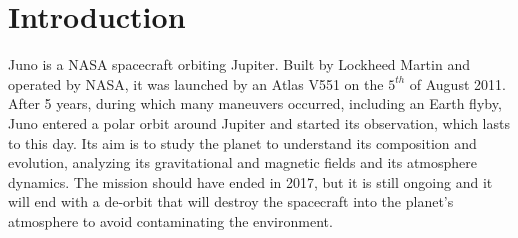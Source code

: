 \section{Introduction}
\label{sec:introduction}

Juno is a NASA spacecraft orbiting Jupiter. Built by Lockheed Martin and operated by NASA, it was launched by an Atlas V551 on the $5^{th}$ of August 2011. After 5 years, during which many maneuvers occurred, including an Earth flyby, Juno entered a polar orbit around Jupiter and started its observation, which lasts to this day. Its aim is to study the planet to understand its composition and evolution, analyzing its gravitational and magnetic fields and its atmosphere dynamics. The mission should have ended in 2017, but it is still ongoing \cite{fact_sheet} and it will end with a de-orbit that will destroy the spacecraft into the planet's atmosphere to avoid contaminating the environment.